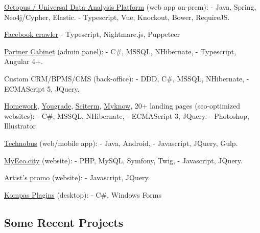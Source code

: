 \documentclass{yb}
\begin{document}
\href{https://baltinfocom.ru/BigData\#en}{Octopus / Universal Data Analysis Platform} (web app on-prem): 
\newline - Java, Spring, Neo4j/Cypher, Elastic.
\newline - Typescript, Vue, Knockout, Bower, RequireJS.

\href{https://github.com/NikitaIT/facebook-crawling-nightmare}{Facebook crawler}
\newline - Typescript, Nightmare.js, Puppeteer

\href{https://hmwk.ru/partner/}{Partner Cabinet} (admin panel): \newline - C\#, MSSQL, NHibernate, 
\newline - Typescript, Angular 4+.

Custom CRM/BPMS/CMS (back-office):
\newline - DDD, C\#, MSSQL, NHibernate,
\newline - ECMAScript 5, JQuery.

\href{https://homework.ru}{Homework}, \href{https://yougrade.ru}{Yougrade}, 
\href{http://sciterm.ru}{Sciterm},
\href{https://myknow.ru}{Myknow}, 20+ landing pages (seo-optimized websites):
\newline - C\#, MSSQL, NHibernate,
\newline - ECMAScript 3, JQuery.
\newline - Photoshop, Illustrator


\href{https://nikitait.github.io/ru.returnonintelligence.technobus.front}{Technobus} (web/mobile app):
\newline - Java, Android,
\newline - Javascript, JQuery, Gulp.

\href{https://github.com/HackSpb/eco-project}{MyEco.city} (website):
\newline - PHP, MySQL, Symfony, Twig,
\newline - Javascript, JQuery.

\href{https://nikitait.github.io/xDontStopMeNow/}{Artist's promo} (website):
\newline - Javascript, JQuery.

\href{https://github.com/NikitaIT/Projects/tree/master/Kompas Delail Plagin C\%23}{Kompas Plagins} (desktop):
\newline - C\#, Windows Forms

\subsection*{Some Recent Projects}
\end{document}
